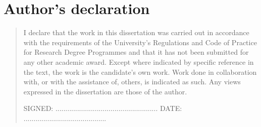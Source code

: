 \part*{Author's declaration}

\begin{quote}
I declare that the work in this dissertation was carried out in accordance with the requirements of  the University's Regulations and Code of Practice for Research Degree Programmes and that it  has not been submitted for any other academic award. Except where indicated by specific  reference in the text, the work is the candidate's own work. Work done in collaboration with, or with the assistance of, others, is indicated as such. Any views expressed in the dissertation are those of the author.

\vspace{1.5cm}
\noindent
\hspace{-0.75cm}\textsc{SIGNED: .................................................... DATE: ..........................................}
\end{quote}